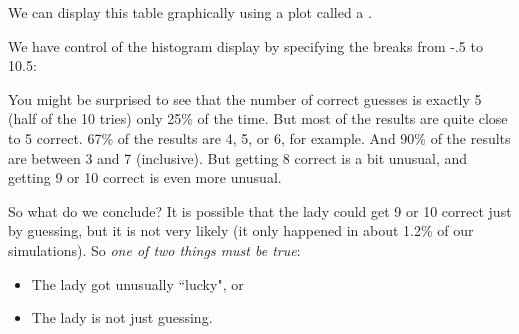 We can display this table graphically using a plot called a .
\begin{center}
\begin{knitrout}
\end{knitrout}

\end{center}
We have control of the histogram display by 
specifying the breaks from -.5 to 10.5:
\begin{knitrout}
\end{knitrout}


You might be surprised to see that the number of correct guesses
is exactly 5 (half of the 10 tries) only 
25\%
of the time.  But most of the results are quite close to 5 correct.
67\% of the results are 
4, 5, or 6, for example.
And 90\% of the results 
are  between 3 and 7 (inclusive).
But getting 8 correct is a bit unusual, and getting 9 or 10 correct is even 
more unusual.  

So what do we conclude?  It is possible that the lady could get 9 or 10 correct
just by guessing, but it is not very likely (it only happened in about
1.2\% of our simulations). 
So \emph{one of two things must be true}:
\begin{itemize}
\item The lady got unusually ``lucky", or 
\item The lady is not just guessing.
\end{itemize}

